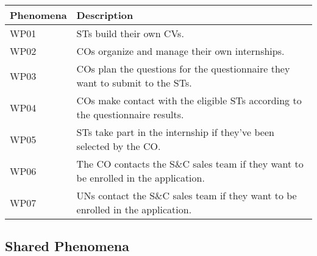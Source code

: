 \begin{longtable}{|l|p{}|}
    \hline
    \textbf{Phenomena} & \textbf{Description}                                                                \\
    \hline \hline
    WP01               & STs build their own CVs.                                                            \\
    \hline
    WP02               & COs organize and manage their own internships.                                      \\
    \hline
    WP03               & COs plan the questions for the questionnaire they want to submit to the STs.        \\
    \hline
    WP04               & COs make contact with the eligible STs according to the questionnaire results.      \\
    \hline
    WP05               & STs take part in the internship if they've been selected by the CO.                 \\
    \hline
    WP06               & The CO contacts the S\&C sales team if they want to be enrolled in the application. \\
    \hline
    WP07               & UNs contact the S\&C sales team if they want to be enrolled in the application.     \\
    \hline
\end{longtable}

\subsection{Shared Phenomena}
\label{subsec:shared-phenomena}%

